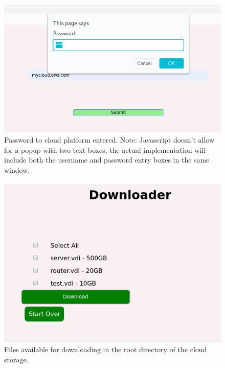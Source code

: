 \documentclass{article}
\begin{document}
    \begin{figure}[h]
    \includegraphics[scale=.7]{s3}
        \caption{Password to cloud platform entered. Note: Javascript doesn't allow for a popup with two text boxes, the actual implementation
            will include both the username and password entry boxes in the same window.}
    \end{figure}

    \begin{figure}[h]
    \includegraphics[scale=.7]{s4}
        \caption{Files available for downloading in the root directory of the cloud storage.}
    \end{figure}
\end{document}
